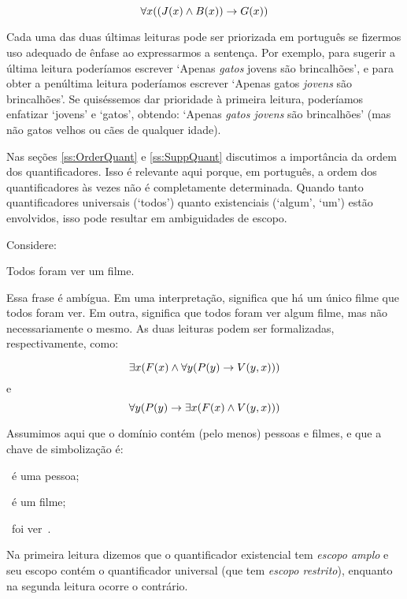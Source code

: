 $$\forall x ((\mathord{J}(x) \wedge \mathord{B}(x)) \rightarrow \mathord{G}(x ))$$

Cada uma das duas últimas leituras pode ser priorizada em português se fizermos uso adequado de ênfase ao expressarmos a sentença. Por exemplo, para sugerir a última leitura poderíamos escrever `Apenas \emph{gatos} jovens são brincalhões', e para obter a penúltima leitura poderíamos escrever `Apenas gatos \emph{jovens} são brincalhões'. Se quiséssemos dar prioridade à primeira leitura, poderíamos enfatizar `jovens' e `gatos', obtendo: `Apenas \emph{gatos jovens} são brincalhões' (mas não gatos velhos ou cães de qualquer idade).

Nas seções \ref{ss:OrderQuant} e \ref{ss:SuppQuant} discutimos a importância da ordem dos quantificadores. Isso é relevante aqui porque, em português, a ordem dos quantificadores às vezes não é completamente determinada. Quando tanto quantificadores universais (`todos') quanto existenciais (`algum', `um') estão envolvidos, isso pode resultar em ambiguidades de escopo.

Considere:

\begin{earg}
    \item [\ex{everya}] Todos foram ver um filme.
\end{earg}

Essa frase é ambígua. Em uma interpretação, significa que há um único filme que todos foram ver. Em outra, significa que todos foram ver algum filme, mas não necessariamente o mesmo. As duas leituras podem ser formalizadas, respectivamente, como:

\begin{center}
$$\exists x (\mathord{F}(x) \wedge \forall y (\mathord{P}(y) \rightarrow \mathord{V}(y, x)))$$
e
$$\forall y (\mathord{P}(y) \rightarrow \exists x (\mathord{F}(x) \wedge \mathord{V}(y, x)))$$
\end{center}

Assumimos aqui que o domínio contém (pelo menos) pessoas e filmes, e que a chave de simbolização é:

\begin{ekey}
    \item [\atom{P}{y}] ~é uma pessoa;
    \item [\atom{F}{x}] ~é um filme;
    \item [\atom{V}{y, x}] ~foi ver~.
\end{ekey}

Na primeira leitura dizemos que o quantificador existencial tem \emph{escopo amplo} e seu escopo contém o quantificador universal (que tem \emph{escopo restrito}), enquanto na segunda leitura ocorre o contrário.

